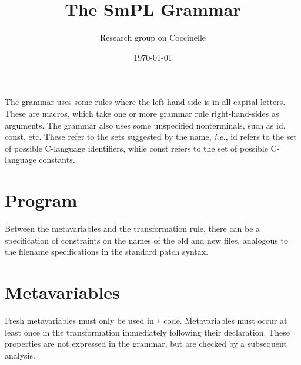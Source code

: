 \documentclass{article}
\title{The SmPL Grammar}
\author{Research group on Coccinelle}
\date{\today}
\begin{document}
\maketitle



The grammar uses some rules where the left-hand side is in all capital
letters.  These are macros, which take one or more grammar rule
right-hand-sides as arguments.  The grammar also uses some unspecified
nonterminals, such as {\sf id}, {\sf const}, etc.  These refer to the sets
suggested by the name, {\em i.e.}, {\sf id} refers to the set of possible
C-language identifiers, while {\sf const} refers to the set of possible
C-language constants.

\section{Program}

\begin{grammar}



\end{grammar}

Between the metavariables and the transformation rule, there can be a
specification of constraints on the names of the old and new files,
analogous to the filename specifications in the standard patch syntax.

\section{Metavariables}

Fresh metavariables must only be used in {\tt +} code.  Metavariables must
occur at least once in the transformation immediately following their
declaration.  These properties are not expressed in the grammar, but are
checked by a subsequent analysis.
\end{document}
